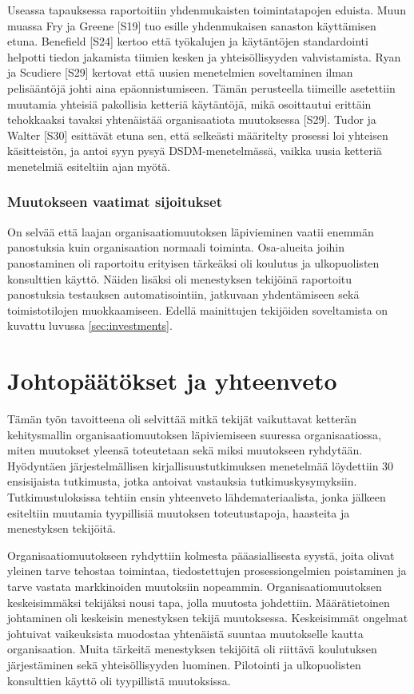 Useassa tapauksessa raportoitiin yhdenmukaisten toimintatapojen eduista.
Muun muassa Fry ja Greene [S19] tuo esille yhdenmukaisen sanaston käyttämisen
etuna. Benefield [S24] kertoo että työkalujen ja käytäntöjen standardointi
helpotti tiedon jakamista tiimien kesken ja yhteisöllisyyden vahvistamista. Ryan
ja Scudiere [S29] kertovat että uusien menetelmien soveltaminen ilman
pelisääntöjä johti aina epäonnistumiseen. Tämän perusteella tiimeille asetettiin
muutamia yhteisiä pakollisia ketteriä käytäntöjä, mikä osoittautui erittäin
tehokkaaksi tavaksi yhtenäistää organisaatiota muutoksessa [S29]. Tudor ja
Walter [S30] esittävät etuna sen, että selkeästi määritelty prosessi loi
yhteisen käsitteistön, ja antoi syyn pysyä DSDM-menetelmässä, vaikka uusia
ketteriä menetelmiä esiteltiin ajan myötä.

\subsubsection{Muutokseen vaatimat sijoitukset}

On selvää että laajan organisaatiomuutoksen läpivieminen vaatii enemmän
panostuksia kuin organisaation normaali toiminta. Osa-alueita joihin
panostaminen oli raportoitu erityisen tärkeäksi oli koulutus ja ulkopuolisten
konsulttien käyttö. Näiden lisäksi oli menestyksen tekijöinä raportoitu
panostuksia testauksen automatisointiin, jatkuvaan yhdentämiseen sekä
toimistotilojen muokkaamiseen. Edellä mainittujen tekijöiden soveltamista
on kuvattu luvussa \ref{sec:investments}.


\clearpage
\section{Johtopäätökset ja yhteenveto}
\label{sec:johtopaatokset}

Tämän työn tavoitteena oli selvittää mitkä tekijät vaikuttavat ketterän
kehitysmallin organisaatiomuutoksen läpiviemiseen suuressa organisaatiossa,
miten muutokset yleensä toteutetaan sekä miksi muutokseen ryhdytään. Hyödyntäen
järjestelmällisen kirjallisuustutkimuksen menetelmää löydettiin 30 ensisijaista
tutkimusta, jotka antoivat vastauksia tutkimuskysymyksiin. Tutkimustuloksissa
tehtiin ensin yhteenveto lähdemateriaalista, jonka jälkeen esiteltiin muutamia
tyypillisiä muutoksen toteutustapoja, haasteita ja menestyksen tekijöitä.

Organisaatiomuutokseen ryhdyttiin kolmesta pääasiallisesta syystä, joita olivat
yleinen tarve tehostaa toimintaa, tiedostettujen prosessiongelmien poistaminen
ja tarve vastata markkinoiden muutoksiin nopeammin. Organisaatiomuutoksen
keskeisimmäksi tekijäksi nousi tapa, jolla muutosta johdettiin. Määrätietoinen
johtaminen oli keskeisin menestyksen tekijä muutoksessa. Keskeisimmät ongelmat
johtuivat vaikeuksista muodostaa yhtenäistä suuntaa muutokselle kautta
organisaation. Muita tärkeitä menestyksen tekijöitä oli riittävä koulutuksen
järjestäminen sekä yhteisöllisyyden luominen. Pilotointi ja ulkopuolisten
konsulttien käyttö oli tyypillistä muutoksissa.

